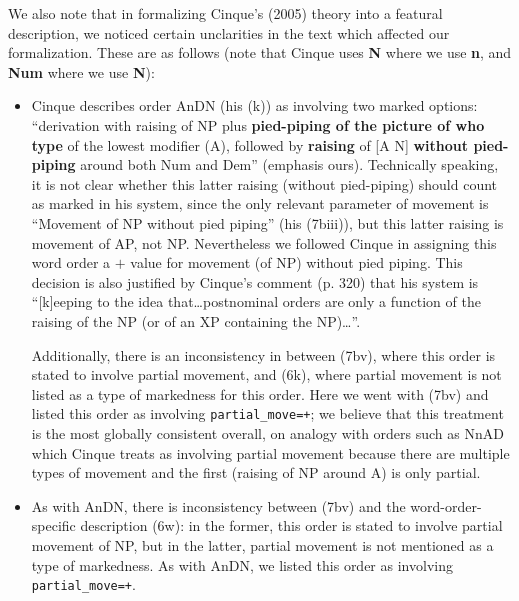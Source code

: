 \documentclass[11pt]{article}
\begin{document}
We also note that in formalizing Cinque's (2005) theory into a
featural description, we noticed certain unclarities in the text which
affected our formalization.  These are as follows (note that Cinque
uses \textbf{N} where we use \textbf{n}, and \textbf{Num} where we use
\textbf{N}):
%
\begin{itemize}
\item Cinque describes order AnDN (his (k)) as involving two marked
  options: ``derivation with raising of NP plus \textbf{pied-piping of
    the picture of who type} of the lowest modifier (A), followed by
  \textbf{raising} of [A N] \textbf{without pied-piping} around both
  Num and Dem'' (emphasis ours).  Technically speaking, it is not
  clear whether this latter raising (without pied-piping) should count
  as marked in his system, since the only relevant parameter of
  movement is ``Movement of NP without pied piping'' (his (7biii)),
  but this latter raising is movement of AP, not NP.  Nevertheless we
  followed Cinque in assigning this word order a $+$ value for
  movement (of NP) without pied piping.  This decision is also
  justified by Cinque's comment (p. 320) that his system is ``[k]eeping to the
  idea that\ldots postnominal orders are only a function of the
  raising of the NP (or of an XP containing the NP)\ldots''.

Additionally, there is an
   inconsistency in \citet{cinque2005deriving} between (7bv), where
   this order is stated to involve partial movement, and (6k), where
   partial movement is not listed as a type of markedness for this
   order. Here we went with (7bv) and listed this order as involving
   \verb-partial_move=+-; we believe that this treatment is the most
   globally consistent overall, on analogy with orders such as NnAD
   which Cinque treats as involving partial movement because there are
   multiple types of movement and the first (raising of NP around A)
   is only partial.
 \item As with AnDN, there is inconsistency between (7bv) and the
   word-order-specific description (6w): in the  former, this order is
   stated to involve partial movement of NP, but in the latter,
   partial movement is not mentioned as a type of markedness.  As with AnDN,
   we listed this order as involving \verb-partial_move=+-.   %
\end{itemize}
\end{document}
